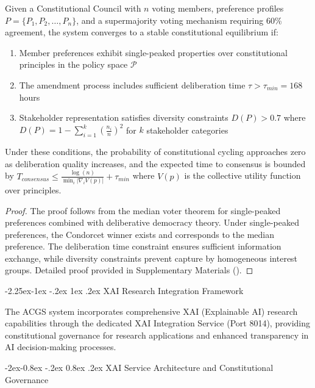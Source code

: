 \documentclass[manuscript,screen,9pt]{acmart}
\makeatletter
\renewcommand\subsection{\@startsection{subsection}{2}{\z@}%
  {-2.25ex\@plus -1ex \@minus -.2ex}%
  {1ex \@plus .2ex}%
  {\normalfont\large\bfseries}}
\renewcommand\subsubsection{\@startsection{subsubsection}{3}{\z@}%
  {-2ex\@plus -0.8ex \@minus -.2ex}%
  {0.8ex \@plus .2ex}%
  {\normalfont\normalsize\bfseries}}
\makeatother
\begin{document}
\begin{theorem}
\label{thm:democratic_convergence}
Given a Constitutional Council with $n$ voting members, preference profiles $P = \{P_1, P_2, \ldots, P_n\}$, and a supermajority voting mechanism requiring 60\% agreement, the system converges to a stable constitutional equilibrium if:
\begin{enumerate}[itemsep=1pt,parsep=1pt]
    \item Member preferences exhibit single-peaked properties over constitutional principles in the policy space $\mathcal{P}$
    \item The amendment process includes sufficient deliberation time $\tau > \tau_{min} = 168$ hours
    \item Stakeholder representation satisfies diversity constraints $D(P) > 0.7$ where $D(P) = 1 - \sum_{i=1}^{k} (\frac{n_i}{n})^2$ for $k$ stakeholder categories
\end{enumerate}
Under these conditions, the probability of constitutional cycling approaches zero as deliberation quality increases, and the expected time to consensus is bounded by $T_{consensus} \leq \frac{\log(n)}{\min_i |\nabla_i V(p)|} + \tau_{min}$ where $V(p)$ is the collective utility function over principles.
\end{theorem}
\begin{proof}
The proof follows from the median voter theorem for single-peaked preferences combined with deliberative democracy theory. Under single-peaked preferences, the Condorcet winner exists and corresponds to the median preference. The deliberation time constraint ensures sufficient information exchange, while diversity constraints prevent capture by homogeneous interest groups. Detailed proof provided in Supplementary Materials ().
\end{proof}

\subsection{XAI Research Integration Framework}
\label{subsec:xai_research_integration}

The ACGS system incorporates comprehensive XAI (Explainable AI) research capabilities through the dedicated XAI Integration Service (Port 8014), providing constitutional governance for research applications and enhanced transparency in AI decision-making processes.

\subsubsection{XAI Service Architecture and Constitutional Governance}
\label{subsubsec:xai_service_architecture}
\end{document}
